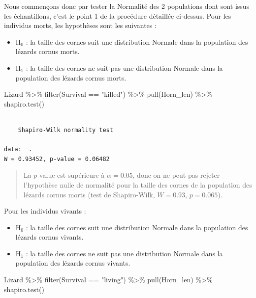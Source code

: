 \documentclass[
  a4paper,
  DIV=11,
  numbers=noendperiod,
  oneside]{scrreprt}
\newenvironment{Shaded}{}{}
\newcommand{\FunctionTok}[1]{\textcolor[rgb]{0.44,0.26,0.76}{#1}}
\newcommand{\NormalTok}[1]{\textcolor[rgb]{0.14,0.16,0.18}{#1}}
\newcommand{\SpecialCharTok}[1]{\textcolor[rgb]{0.00,0.36,0.77}{#1}}
\newcommand{\StringTok}[1]{\textcolor[rgb]{0.01,0.18,0.38}{#1}}
\providecommand{\tightlist}{%
  \setlength{\itemsep}{0pt}\setlength{\parskip}{0pt}}\usepackage{longtable,booktabs,array}
\begin{document}
Nous commençons donc par tester la Normalité des 2 populations dont sont
issus les échantillons, c'est le point 1 de la procédure détaillée
ci-dessus. Pour les individus morts, les hypothèses sont les suivantes :

\begin{itemize}
\tightlist
\item
  H\(_0\) : la taille des cornes suit une distribution Normale dans la
  population des lézards cornus morts.
\item
  H\(_1\) : la taille des cornes ne suit pas une distribution Normale
  dans la population des lézards cornus morts.
\end{itemize}

\begin{Shaded}
\begin{Highlighting}[]
\NormalTok{Lizard }\SpecialCharTok{\%\textgreater{}\%}
  \FunctionTok{filter}\NormalTok{(Survival }\SpecialCharTok{==} \StringTok{"killed"}\NormalTok{) }\SpecialCharTok{\%\textgreater{}\%}
  \FunctionTok{pull}\NormalTok{(Horn\_len) }\SpecialCharTok{\%\textgreater{}\%}
  \FunctionTok{shapiro.test}\NormalTok{()}
\end{Highlighting}
\end{Shaded}

\begin{verbatim}

    Shapiro-Wilk normality test

data:  .
W = 0.93452, p-value = 0.06482
\end{verbatim}

\begin{quote}
La \(p\)-value est supérieure à \(\alpha = 0.05\), donc on ne peut pas
rejeter l'hypothèse nulle de normalité pour la taille des cornes de la
population des lézards cornus morts (test de Shapiro-Wilk, \(W = 0.93\),
\(p = 0.065\)).
\end{quote}

Pour les individus vivants :

\begin{itemize}
\tightlist
\item
  H\(_0\) : la taille des cornes suit une distribution Normale dans la
  population des lézards cornus vivants.
\item
  H\(_1\) : la taille des cornes ne suit pas une distribution Normale
  dans la population des lézards cornus vivants.
\end{itemize}

\begin{Shaded}
\begin{Highlighting}[]
\NormalTok{Lizard }\SpecialCharTok{\%\textgreater{}\%}
  \FunctionTok{filter}\NormalTok{(Survival }\SpecialCharTok{==} \StringTok{"living"}\NormalTok{) }\SpecialCharTok{\%\textgreater{}\%}
  \FunctionTok{pull}\NormalTok{(Horn\_len) }\SpecialCharTok{\%\textgreater{}\%}
  \FunctionTok{shapiro.test}\NormalTok{()}
\end{Highlighting}
\end{Shaded}
\end{document}
